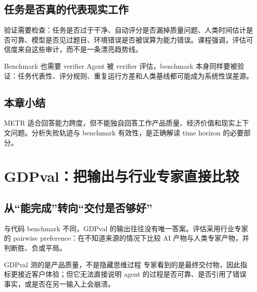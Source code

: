 \documentclass[a4paper]{article}
\begin{document}
\subsection{任务是否真的代表现实工作}


验证需要检查：任务是否过于干净、自动评分是否漏掉质量问题、人类时间估计是否可靠、模型是否见过题目、环境错误是否被误算为能力错误。课程强调，评估可信度来自这些审计，而不是一条漂亮趋势线。

\begin{importantbox}{Benchmark 也需要 verifier}
Agent 被 verifier 评估，benchmark 本身同样要被验证：任务代表性、评分规则、重复运行方差和人类基线都可能成为系统性误差源。
\end{importantbox}

\subsection{本章小结}

METR 适合回答能力跨度，但不能独自回答工作产品质量、经济价值和现实上下文问题。分析失败轨迹与 benchmark 有效性，是正确解读 time horizon 的必要部分。

\section{GDPval：把输出与行业专家直接比较}

\subsection{从“能完成”转向“交付是否够好”}




与代码 benchmark 不同，GDPval 的输出往往没有唯一答案。评估采用行业专家的 pairwise preference：在不知道来源的情况下比较 AI 产物与人类专家产物，并判断胜、负或平局。

\begin{importantbox}{GDPval 测的是产品质量，不是隐藏思维过程}
专家看到的是最终交付物，因此指标更接近客户体验；但它无法直接说明 agent 的过程是否可靠、是否引用了错误事实，或是否在另一输入上会崩溃。
\end{importantbox}
\end{document}
